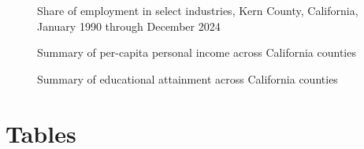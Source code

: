 \documentclass[12pt]{article}
\begin{document}
\begin{figure}[htbp]
  \centering
  \resizebox{\textwidth}{!}{
  }
\caption{Share of employment in select industries, Kern County, California, January 1990 through December 2024}
\end{figure}

\begin{figure}[htbp]
  \centering
  \resizebox{\textwidth}{!}{
  }  
  \caption{Summary of per-capita personal income across California counties}
\end{figure}

\begin{figure}[htbp]
  \centering
  \resizebox{\textwidth}{!}{
  }  
  \caption{Summary of educational attainment across California counties}
\end{figure}

\clearpage
\pagebreak

\section{Tables}

\begin{table}[h]
  \centering
  \caption{Counterfactual employment values, January $1997$ to December $2009$}
  \resizebox{\textwidth}{!}{
    }
\end{table}

\begin{table}[h]
  \centering
  \caption{Counterfactual employment values, January 2010 to December 2024}
  \resizebox{\textwidth}{!}{
    }
\end{table}








\end{document}
